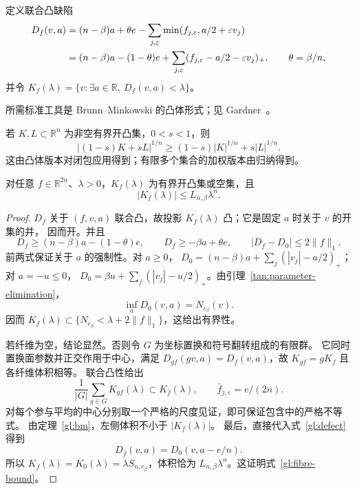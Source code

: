 定义联合凸缺陷
\begin{align}
 D_f(v,a)&=(n-\beta)a+\theta e-
          \sum_{j,\varepsilon}\min(f_{j,\varepsilon},a/2+\varepsilon v_j)\notag\\
 &=(n-\beta)a-(1-\theta)e+
          \sum_{j,\varepsilon}(f_{j,\varepsilon}-a/2-\varepsilon v_j)_+,
 \qquad\theta=\beta/n,\label{gl:defect}
\end{align}
并令 $K_f(\lambda)=\{v:\exists a\in\mathbb R,\ D_f(v,a)<\lambda\}$。

所需标准工具是 Brunn--Minkowski 的凸体形式；见 Gardner~\cite{Gardner2002}。
\begin{classical}\label{gl:bm}
若 $K,L\subset\mathbb R^n$ 为非空有界开凸集，$0<s<1$，则
\[
 |(1-s)K+sL|^{1/n}\ge(1-s)|K|^{1/n}+s|L|^{1/n}.
\]
这由凸体版本对闭包应用得到；有限多个集合的加权版本由归纳得到。
\end{classical}

\begin{lemma}[面质量纤维的最优体积]\label{gl:fibre-volume}
对任意 $f\in\mathbb R^{2n}$、$\lambda>0$，$K_f(\lambda)$ 为有界开凸集或空集，且
\begin{equation}\label{gl:fibre-bound}
 |K_f(\lambda)|\le L_{n,\beta}\lambda^n.
\end{equation}
\end{lemma}
\begin{proof}
$D_f$ 关于 $(f,v,a)$ 联合凸，故投影 $K_f(\lambda)$ 凸；它是固定 $a$ 时关于 $v$ 的开集的并，
因而开。并且
\[
 D_f\ge(n-\beta)a-(1-\theta)e,\qquad D_f\ge-\beta a+\theta e,
 \qquad |D_f-D_0|\le2\|f\|_1.
\]
前两式保证关于 $a$ 的强制性。对 $a\ge0$，
$D_0=(n-\beta)a+\sum_j(|v_j|-a/2)_+$；对 $a=-u\le0$，
$D_0=\beta u+\sum_j(|v_j|-u/2)_+$。由引理~\ref{tan:parameter-elimination}，
\[
 \inf_aD_0(v,a)=N_{c_\beta}(v).
\]
因而 $K_f(\lambda)\subset\{N_{c_\beta}<\lambda+2\|f\|_1\}$，这给出有界性。

若纤维为空，结论显然。否则令 $G$ 为坐标置换和符号翻转组成的有限群。
它同时置换面参数并正交作用于中心，满足
$D_{gf}(gv,a)=D_f(v,a)$，故 $K_{gf}=gK_f$ 且各纤维体积相等。
联合凸性给出
\[
 \frac1{|G|}\sum_{g\in G}K_{gf}(\lambda)\subset K_{\bar f}(\lambda),
 \qquad \bar f_{j,\varepsilon}=e/(2n).
\]
对每个参与平均的中心分别取一个严格的尺度见证，即可保证包含中的严格不等式。
由定理~\ref{gl:bm}，左侧体积不小于 $|K_f(\lambda)|$。
最后，直接代入式~\eqref{gl:defect}得到
\[
 D_{\bar f}(v,a)=D_0(v,a-e/n).
\]
所以 $K_{\bar f}(\lambda)=K_0(\lambda)=\lambda S_{n,c_\beta}$，体积恰为
$L_{n,\beta}\lambda^n$。这证明式~\eqref{gl:fibre-bound}。
\end{proof}

